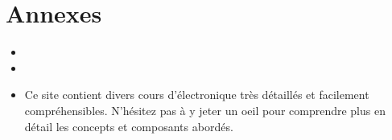 \section{Annexes}

\begin{itemize}
	\item {}
	\item {}
	\item {}
		  Ce site contient divers cours d'électronique très détaillés et facilement compréhensibles.
		  N'hésitez pas à y jeter un oeil pour comprendre plus en détail les concepts et composants abordés.
\end{itemize}